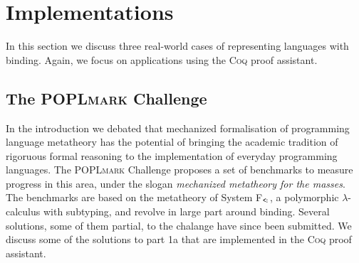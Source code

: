 \documentclass[a4paper,11pt]{article}
\newcommand{\name}[1]{\textsc{#1}\xspace}
\def\Coq{\name{Coq}}
\def\POPLmark{\name{POPLmark}}
\begin{document}
\section{Implementations}

In this section we discuss three real-world cases of representing %
languages with binding. Again, we focus on applications using the \Coq
proof assistant.


\subsection{The \POPLmark Challenge}

In the introduction we debated that mechanized formalisation of
programming language metatheory has the potential of bringing the
academic tradition of rigoruous formal reasoning to the implementation
of everyday programming languages.
The \POPLmark Challenge \cite{poplmark-challenge-05} proposes a set of
benchmarks to measure progress in this area, under the slogan {\em
  mechanized metatheory for the masses}.
The benchmarks are based on the metatheory of System
F$_\texttt{<\!:}$, a polymorphic $\lambda$-calculus with subtyping,
and revolve in large part around binding.
Several solutions, some of them partial, to the chalange have since
been submitted. We discuss some of the solutions to part 1a that are
implemented in the \Coq proof assistant.
\end{document}
